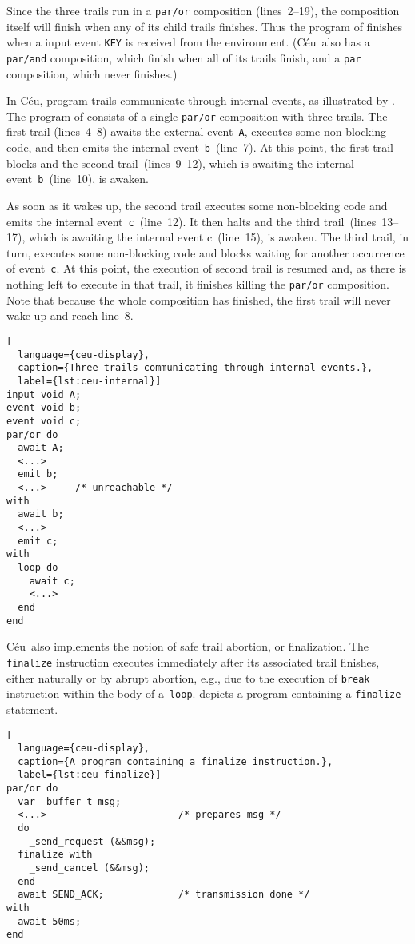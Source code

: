 \documentclass[10pt,a4paper,oneside,leqno]{article}
\numberwithin{equation}{section}
\def\Ceu{C\'eu}
\def\ceulst#1{\lstinline[language=ceu,basicstyle=\ttfamily]|#1|}
\begin{document}
Since the three trails run in a \ceulst{par/or} composition (lines~2--19),
the composition itself will finish when any of its child trails finishes.
Thus the program of  finishes when a input event
\ceulst{KEY} is received from the environment.  (\Ceu\ also has a
\ceulst{par/and} composition, which finish when all of its trails finish,
and a \ceulst{par} composition, which never finishes.)

In \Ceu, program trails communicate through internal events, as illustrated
by .  The program of  consists
of a single \ceulst{par/or} composition with three trails.  The first trail
(lines~4--8) awaits the external event~\ceulst{A}, executes some
non-blocking code, and then emits the internal event~\ceulst{b}~(line~7).
At this point, the first trail blocks and the second trail~(lines~9--12),
which is awaiting the internal event~\ceulst{b}~(line~10), is awaken.

As soon as it wakes up, the second trail executes some non-blocking code and
emits the internal event~\ceulst{c}~(line~12).  It then halts and the third
trail~(lines~13--17), which is awaiting the internal event c~(line~15), is
awaken.  The third trail, in turn, executes some non-blocking code and
blocks waiting for another occurrence of event~\ceulst{c}.  At this point,
the execution of second trail is resumed and, as there is nothing left to
execute in that trail, it finishes killing the \ceulst{par/or} composition.
Note that because the whole composition has finished, the first trail will
never wake up and reach line~8.

\begin{lstlisting}[
  language={ceu-display},
  caption={Three trails communicating through internal events.},
  label={lst:ceu-internal}]
input void A;
event void b;
event void c;
par/or do
  await A;
  <...>
  emit b;
  <...>     /* unreachable */
with
  await b;
  <...>
  emit c;
with
  loop do
    await c;
    <...>
  end
end
\end{lstlisting}

\Ceu\ also implements the notion of safe trail abortion, or finalization.
The \ceulst{finalize} instruction executes immediately after its associated
trail finishes, either naturally or by abrupt abortion, e.g., due to the
execution of \ceulst{break} instruction within the body of a~\ceulst{loop}.
 depicts a program containing a \ceulst{finalize}
statement.

\begin{lstlisting}[
  language={ceu-display},
  caption={A program containing a finalize instruction.},
  label={lst:ceu-finalize}]
par/or do
  var _buffer_t msg;
  <...>                       /* prepares msg */
  do
    _send_request (&&msg);
  finalize with
    _send_cancel (&&msg);
  end
  await SEND_ACK;             /* transmission done */
with
  await 50ms;
end
\end{lstlisting}
\end{document}
